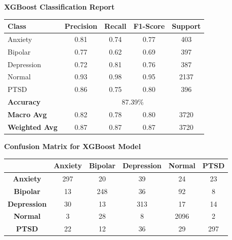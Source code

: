 \begin{center}
    \textbf{XGBoost Classification Report} \\[0.5em]
    \begin{tabular}{|l|c|c|c|c|}
        \hline
        \textbf{Class} & \textbf{Precision} & \textbf{Recall} & \textbf{F1-Score} & \textbf{Support} \\ \hline
        Anxiety        & 0.81               & 0.74            & 0.77              & 403              \\ \hline
        Bipolar        & 0.77               & 0.62            & 0.69              & 397              \\ \hline
        Depression     & 0.72               & 0.81            & 0.76              & 387              \\ \hline
        Normal         & 0.93               & 0.98            & 0.95              & 2137             \\ \hline
        PTSD           & 0.86               & 0.75            & 0.80              & 396              \\ \hline
        \textbf{Accuracy} & \multicolumn{4}{|c|}{87.39\%} \\ \hline
        \textbf{Macro Avg} & 0.82            & 0.78            & 0.80              & 3720             \\ \hline
        \textbf{Weighted Avg} & 0.87         & 0.87            & 0.87              & 3720             \\ \hline
    \end{tabular}
\end{center}

\vspace{0.25em}

\begin{center}
    \textbf{Confusion Matrix for XGBoost Model} \\[0.5em]
    \begin{tabular}{|c|c|c|c|c|c|}
        \hline
        & \textbf{Anxiety} & \textbf{Bipolar} & \textbf{Depression} & \textbf{Normal} & \textbf{PTSD} \\ \hline
        \textbf{Anxiety}    & 297 & 20  & 39  & 24  & 23  \\ \hline
        \textbf{Bipolar}    & 13  & 248 & 36  & 92  & 8   \\ \hline
        \textbf{Depression} & 30  & 13  & 313 & 17  & 14  \\ \hline
        \textbf{Normal}     & 3   & 28  & 8   & 2096 & 2   \\ \hline
        \textbf{PTSD}       & 22  & 12  & 36  & 29  & 297 \\ \hline
    \end{tabular}
\end{center}

